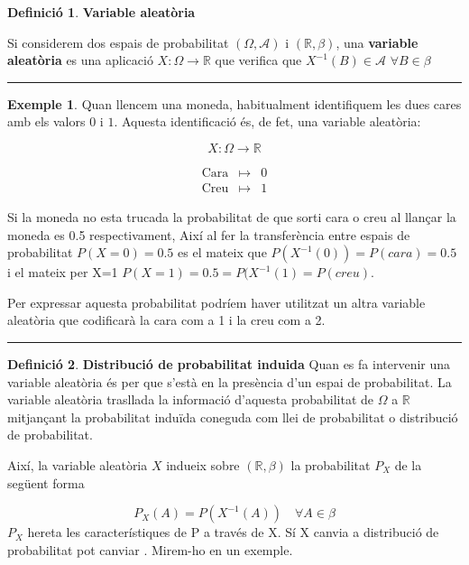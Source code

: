 \documentclass[
  catalan,
]{article}
\theoremstyle{definition}
\newtheorem{definition}{Definició}[section]
\theoremstyle{definition}
\newtheorem{example}{Exemple}[section]
\theoremstyle{definition}
\theoremstyle{definition}
\theoremstyle{remark}
\begin{document}
\begin{definition}
\textbf{Variable aleatòria}

Si considerem dos espais de probabilitat \((\Omega, \mathcal{A})\) i \((\mathbb{R},\beta)\), una \textbf{variable aleatòria} es una aplicació \(X:\Omega \rightarrow \mathbb{R}\) que verifica que \(X^{-1}(B) \in \mathcal{A}\) \(\forall B \in \beta\)
\end{definition}

\begin{center}\rule{0.5\linewidth}{0.5pt}\end{center}

\begin{example}
Quan llencem una moneda, habitualment identifiquem les dues cares amb els valors \(0\) i \(1\). Aquesta identificació és, de fet, una variable aleatòria:

\[
X:\Omega \longrightarrow \mathbb{R}
\]

\[
\begin{array}{ccc}
\text{Cara} & \longmapsto & 0 \\
\text{Creu} & \longmapsto & 1
\end{array}
\]

Si la moneda no esta trucada la probabilitat de que sorti cara o creu al llançar la moneda es 0.5 respectivament, Així al fer la transferència entre espais de probabilitat \(P(X=0)=0.5\) es el mateix que \(P(X^{-1}(0))=P(cara)=0.5\) i el mateix per X=1 \(P(X=1)=0.5=P(X^{-1}(1)=P(creu)\).

Per expressar aquesta probabilitat podríem haver utilitzat un altra variable aleatòria que codificarà la cara com a 1 i la creu com a 2.
\end{example}

\begin{center}\rule{0.5\linewidth}{0.5pt}\end{center}

\begin{definition}
\textbf{Distribució de probabilitat induida}
Quan es fa intervenir una variable aleatòria és per que s'està en la presència d'un espai de probabilitat. La variable aleatòria trasllada la informació d'aquesta probabilitat de \(\Omega\) a \(\mathbb{R}\) mitjançant la probabilitat induïda coneguda com llei de probabilitat o distribució de probabilitat.

Així, la variable aleatòria \(X\) indueix sobre \((\mathbb{R},\beta)\) la probabilitat \(P_X\) de la següent forma

\[
       P_X(A)= P(X^{-1}(A)) \quad \forall A \in \beta
 \]
\(P_X\) hereta les característiques de P a través de X. Sí X canvia a distribució de probabilitat pot canviar . Mirem-ho en un exemple.
\end{definition}
\end{document}
